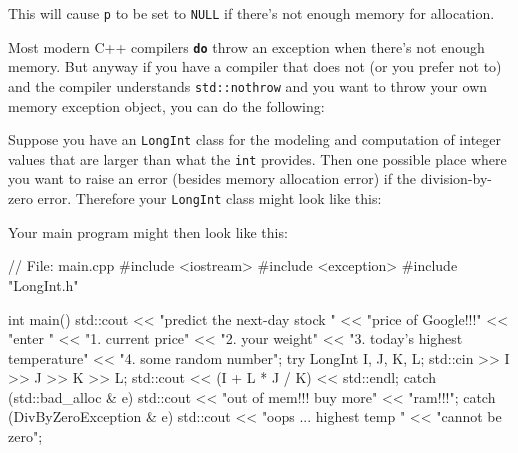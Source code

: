 This will cause \texttt{p} to be set to \texttt{NULL} if
there's not enough memory for allocation.

Most modern C++ compilers \texttt{\textbf{do}} throw an exception when
there's not enough memory. But anyway if you have a
compiler that does not (or you prefer not to) and the compiler
understands \texttt{std::nothrow} and you want to throw your own memory
exception object, you can do the following:


\newpage{}

Suppose you have an \texttt{LongInt} class for the modeling and
computation of integer values that are larger than what the \texttt{int}
provides. Then one possible place where you want to raise an error
(besides memory allocation error) if the division-by-zero error.
Therefore your \texttt{LongInt} class might look like this:


Your main program might then look like this:

\begin{console}
// File: main.cpp
#include <iostream>
#include <exception>
#include "LongInt.h"

int main()
{   
    std::cout << "predict the next-day stock "
    << "price of Google!!!\n"
    << "enter \n"
    << "1. current price\n"
    << "2. your weight\n"
    << "3. today's highest temperature\n"
    << "4. some random number\n";
    try
    {
        LongInt I, J, K, L;
        std::cin >> I >> J >> K >> L;
        std::cout << (I + L * J / K) << std::endl;
    }
    catch (std::bad_alloc & e)
    {
        std::cout << "out of mem!!! buy more"
                  << "ram!!!\n";
    }
    catch (DivByZeroException & e)
    {
        std::cout << "oops ... highest temp "
        << "cannot be zero\n";
    }
}
\end{console}

